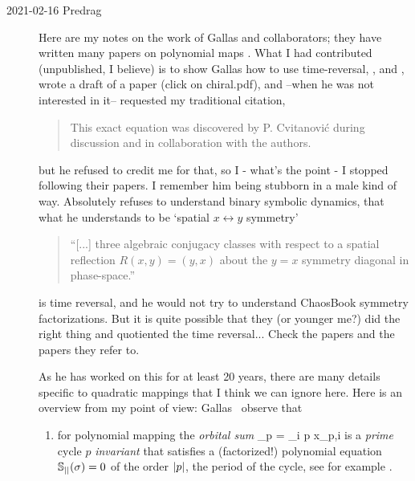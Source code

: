 \begin{description}
\item[2021-02-16 Predrag]
                                                        \toCB
Here are my notes on the work of Gallas and collaborators;
they have written many papers on
polynomial maps%
.
What I had contributed (unpublished, I believe) is to show Gallas
how to use time-reversal,
,  and ,
wrote a draft of a paper (click on
 {chiral.pdf}),
and --when he was not interested in it-- requested my traditional citation,
\begin{quote}
 This exact equation was discovered by P. Cvitanovi\'c
during discussion and in collaboration with the authors.
\end{quote}
but he refused to credit me for that, so I - what's the point - I stopped
following their papers. I remember him being stubborn in a male kind of
way. Absolutely refuses to understand binary symbolic dynamics, that what
he understands to be `spatial $x\leftrightarrow{y}$
symmetry'

\begin{quote}
``[...] three algebraic conjugacy classes with respect to
a spatial reflection $R(x, y) = (y, x)$ about the $y = x$ symmetry
diagonal in phase-space.''
\end{quote}

is time reversal, and he would not try to understand ChaosBook symmetry
factorizations.  But it is quite possible that they (or younger me?) did
the right thing and quotiented the time reversal... Check the papers and
the papers they refer to.

As he has worked on this for at least 20 years, there are many details
specific to quadratic mappings that I think we can ignore here. Here is
an overview from my point of view:
Gallas \etal\ observe that
\begin{enumerate}
  \item
for polynomial mapping  the \emph{orbital sum}
\beq
\sigma_p = \sum_{i \in p} x_{p,i}
is a \emph{prime} cycle $p$ \emph{invariant} that satisfies a
(factorized!) polynomial equation
${\mathbb S}_{||}(\sigma)=0$
of the order ${|p|}$, the period of the cycle, see for example
.


\end{enumerate}
\end{description}
